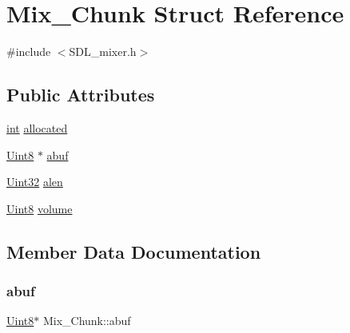 \hypertarget{struct_mix___chunk}{}\section{Mix\+\_\+\+Chunk Struct Reference}
\label{struct_mix___chunk}


{\ttfamily \#include $<$S\+D\+L\+\_\+mixer.\+h$>$}

\subsection*{Public Attributes}
\begin{DoxyCompactItemize}
\item 
\mbox{\hyperlink{warnings_8h_a74f207b5aa4ba51c3a2ad59b219a423b}{int}} \mbox{\hyperlink{struct_mix___chunk_a7b985b90b5f97fffe34834116a281615}{allocated}}
\item 
\mbox{\hyperlink{_s_d_l__stdinc_8h_a2944638813a090aa23e62f4da842c3e2}{Uint8}} $\ast$ \mbox{\hyperlink{struct_mix___chunk_a30b3b1a72677d076a1caa72422bb3774}{abuf}}
\item 
\mbox{\hyperlink{_s_d_l__stdinc_8h_add440eff171ea5f55cb00c4a9ab8672d}{Uint32}} \mbox{\hyperlink{struct_mix___chunk_a958507964471fc4b9fa0d215f1852d05}{alen}}
\item 
\mbox{\hyperlink{_s_d_l__stdinc_8h_a2944638813a090aa23e62f4da842c3e2}{Uint8}} \mbox{\hyperlink{struct_mix___chunk_afc566fd5da7f0ed1f3577f5bc0eac319}{volume}}
\end{DoxyCompactItemize}


\subsection{Member Data Documentation}
\mbox{\label{struct_mix___chunk_a30b3b1a72677d076a1caa72422bb3774}} 
\subsubsection{\texorpdfstring{abuf}{abuf}}
{\footnotesize\ttfamily \mbox{\hyperlink{_s_d_l__stdinc_8h_a2944638813a090aa23e62f4da842c3e2}{Uint8}}$\ast$ Mix\+\_\+\+Chunk\+::abuf}

\mbox{\label{struct_mix___chunk_a958507964471fc4b9fa0d215f1852d05}} 
